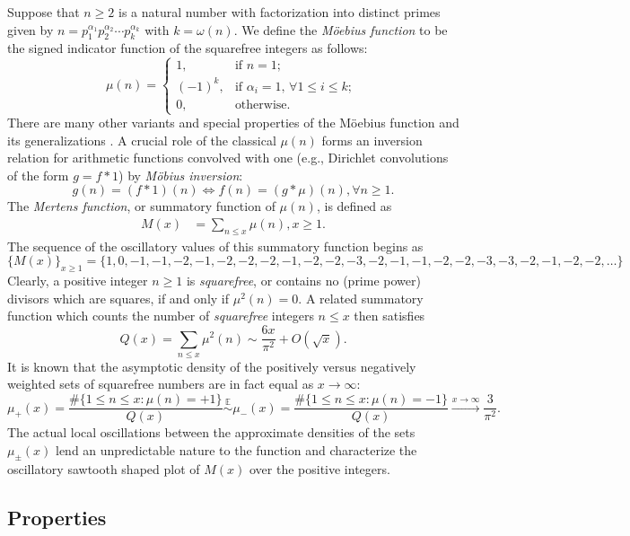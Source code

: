 \documentclass[11pt,reqno,a4letter]{article}
\numberwithin{figure}{section}
\numberwithin{table}{section}
\newcommand{\cf}{\textit{cf.\ }}
\newcommand{\seqnum}[1]{\href{http://oeis.org/#1}{\color{ProcessBlue}{\underline{#1}}}}
\theoremstyle{plain}
\numberwithin{theorem}{section}
\theoremstyle{definition}
\begin{document}
Suppose that $n \geq 2$ is a natural number with factorization into 
distinct primes given by 
$n = p_1^{\alpha_1} p_2^{\alpha_2} \cdots p_k^{\alpha_k}$ with $k = \omega(n)$. 
We define the \emph{M\"oebius function} to be the signed indicator function 
of the squarefree integers as follows: 
\[
\mu(n) = \begin{cases} 
     1, & \text{if $n = 1$; } \\ 
     (-1)^k, & \text{if $\alpha_i = 1$, $\forall 1 \leq i \leq k$; } \\ 
     0, & \text{otherwise.} 
     \end{cases} 
\]
There are many other variants and special properties of the M\"oebius function 
and its generalizations \cite[\cf \S 2]{HANDBOOKNT-2004}. 
A crucial role of the classical $\mu(n)$ forms an inversion relation 
for arithmetic functions convolved with one 
(e.g., Dirichlet convolutions of the form $g = f \ast 1$) 
by \emph{M\"obius inversion}: 
\[
g(n) = (f \ast 1)(n) \iff f(n) = (g \ast \mu)(n), \forall n \geq 1. 
\]
The \emph{Mertens function}, or summatory function of $\mu(n)$, is defined as 
\begin{align*} 
M(x) & = \sum_{n \leq x} \mu(n), x \geq 1. 
\end{align*} 
The sequence of the oscillatory values of this summatory function begins as 
\cite[\seqnum{A002321}]{OEIS} 
\[
\{M(x)\}_{x \geq 1} = \{1, 0, -1, -1, -2, -1, -2, -2, -2, -1, -2, -2, -3, -2, 
     -1, -1, -2, -2, -3, -3, -2, -1, -2, -2, \ldots\}
\]
Clearly, a positive integer $n \geq 1$ is \emph{squarefree}, or contains no (prime power) divisors which are 
squares, if and only if $\mu^2(n) = 0$. 
A related summatory function which counts the 
number of \emph{squarefree} integers $n \leq x$ then satisfies 
\cite[\S 18.6]{HARDYWRIGHT} \cite[\seqnum{A013928}]{OEIS} 
\[ 
Q(x) = \sum_{n \leq x} \mu^2(n) \sim \frac{6x}{\pi^2} + O\left(\sqrt{x}\right). 
\] 
It is known that the asymptotic density of the positively versus negatively 
weighted sets of squarefree numbers are in fact equal as $x \rightarrow \infty$: 
\[
\mu_{+}(x) = \frac{\#\{1 \leq n \leq x: \mu(n) = +1\}}{Q(x)} \overset{\mathbb{E}}{\sim} 
     \mu_{-}(x) = \frac{\#\{1 \leq n \leq x: \mu(n) = -1\}}{Q(x)} 
     \xrightarrow{x \rightarrow \infty} \frac{3}{\pi^2}. 
\]
The actual local oscillations between the approximate densities of the sets 
$\mu_{\pm}(x)$ lend an unpredictable nature to the function and characterize the 
oscillatory sawtooth shaped plot of $M(x)$ over the positive integers. 

\subsection{Properties} 
\end{document}
